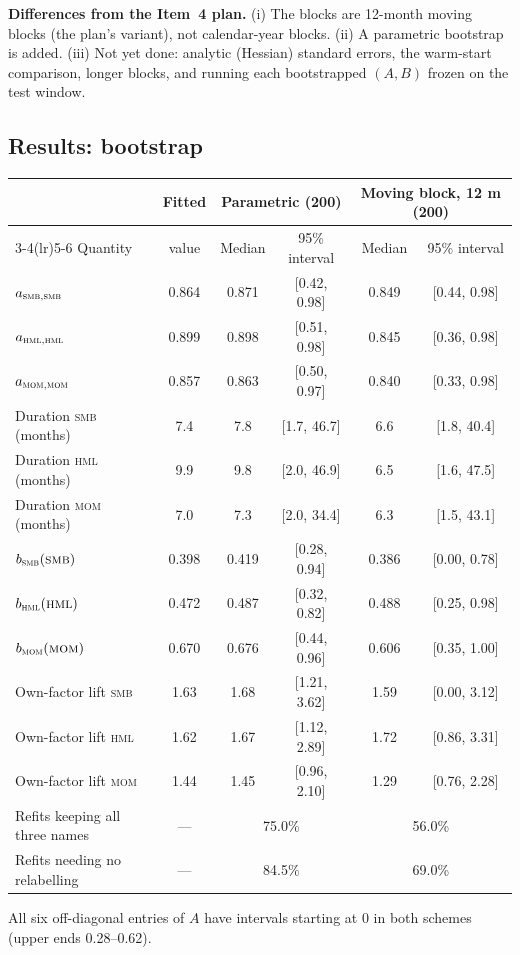 \documentclass[11pt]{article}
\newcommand{\SMB}{\textsc{smb}}
\newcommand{\HML}{\textsc{hml}}
\newcommand{\MOM}{\textsc{mom}}
\begin{document}
\textbf{Differences from the Item~4 plan.} (i) The blocks are 12-month moving blocks (the plan's variant), not calendar-year blocks. (ii) A parametric bootstrap is added. (iii) Not yet done: analytic (Hessian) standard errors, the warm-start comparison, longer blocks, and running each bootstrapped $(A,B)$ frozen on the test window.

\subsection{Results: bootstrap}
\begin{center}
\small
\begin{tabular}{l c cc cc}
\toprule
 & Fitted & \multicolumn{2}{c}{Parametric (200)} & \multicolumn{2}{c}{Moving block, 12 m (200)} \\
\cmidrule(lr){3-4}\cmidrule(lr){5-6}
Quantity & value & Median & 95\% interval & Median & 95\% interval \\
\midrule
$a_{\textsc{smb},\textsc{smb}}$ & 0.864 & 0.871 & [0.42, 0.98] & 0.849 & [0.44, 0.98] \\
$a_{\textsc{hml},\textsc{hml}}$ & 0.899 & 0.898 & [0.51, 0.98] & 0.845 & [0.36, 0.98] \\
$a_{\textsc{mom},\textsc{mom}}$ & 0.857 & 0.863 & [0.50, 0.97] & 0.840 & [0.33, 0.98] \\
\midrule
Duration \SMB{} (months) & 7.4 & 7.8 & [1.7, 46.7] & 6.6 & [1.8, 40.4] \\
Duration \HML{} (months) & 9.9 & 9.8 & [2.0, 46.9] & 6.5 & [1.6, 47.5] \\
Duration \MOM{} (months) & 7.0 & 7.3 & [2.0, 34.4] & 6.3 & [1.5, 43.1] \\
\midrule
$b_{\textsc{smb}}(\textsc{smb})$ & 0.398 & 0.419 & [0.28, 0.94] & 0.386 & [0.00, 0.78] \\
$b_{\textsc{hml}}(\textsc{hml})$ & 0.472 & 0.487 & [0.32, 0.82] & 0.488 & [0.25, 0.98] \\
$b_{\textsc{mom}}(\textsc{mom})$ & 0.670 & 0.676 & [0.44, 0.96] & 0.606 & [0.35, 1.00] \\
\midrule
Own-factor lift \SMB & 1.63 & 1.68 & [1.21, 3.62] & 1.59 & [0.00, 3.12] \\
Own-factor lift \HML & 1.62 & 1.67 & [1.12, 2.89] & 1.72 & [0.86, 3.31] \\
Own-factor lift \MOM & 1.44 & 1.45 & [0.96, 2.10] & 1.29 & [0.76, 2.28] \\
\midrule
Refits keeping all three names & --- & \multicolumn{2}{c}{75.0\%} & \multicolumn{2}{c}{56.0\%} \\
Refits needing no relabelling & --- & \multicolumn{2}{c}{84.5\%} & \multicolumn{2}{c}{69.0\%} \\
\bottomrule
\end{tabular}
\end{center}
\noindent All six off-diagonal entries of $A$ have intervals starting at 0 in both schemes (upper ends 0.28--0.62).
\end{document}
